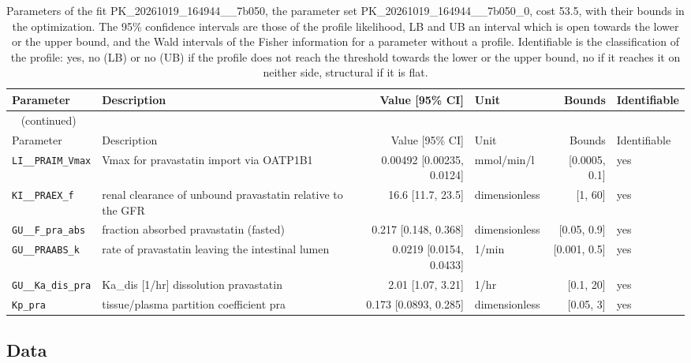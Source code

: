 \documentclass{article}
\begin{document}
\begin{longtable}{llrlrl}
\caption{Parameters of the fit PK\_20261019\_164944\_\_7b050, the parameter set PK\_20261019\_164944\_\_7b050\_0, cost 53.5, with their bounds in the optimization. The 95\% confidence intervals are those of the profile likelihood, LB and UB an interval which is open towards the lower or the upper bound, and the Wald intervals of the Fisher information for a parameter without a profile. Identifiable is the classification of the profile: yes, no (LB) or no (UB) if the profile does not reach the threshold towards the lower or the upper bound, no if it reaches it on neither side, structural if it is flat.}\label{tab:parameters:PK_20261019_164944__7b050} \\
\toprule
Parameter & Description & Value [95\% CI] & Unit & Bounds & Identifiable \\
\midrule
\endfirsthead
\multicolumn{6}{l}{\small\tablename~\thetable{} (continued)} \\
\toprule
Parameter & Description & Value [95\% CI] & Unit & Bounds & Identifiable \\
\midrule
\endhead
\bottomrule
\endlastfoot
\texttt{LI\_\_PRAIM\_Vmax} & Vmax for pravastatin import via OATP1B1 & 0.00492 [0.00235, 0.0124] & mmol/min/l & [0.0005, 0.1] & yes \\
\texttt{KI\_\_PRAEX\_f} & renal clearance of unbound pravastatin relative to the GFR & 16.6 [11.7, 23.5] & dimensionless & [1, 60] & yes \\
\texttt{GU\_\_F\_pra\_abs} & fraction absorbed pravastatin (fasted) & 0.217 [0.148, 0.368] & dimensionless & [0.05, 0.9] & yes \\
\texttt{GU\_\_PRAABS\_k} & rate of pravastatin leaving the intestinal lumen & 0.0219 [0.0154, 0.0433] & 1/min & [0.001, 0.5] & yes \\
\texttt{GU\_\_Ka\_dis\_pra} & Ka\_dis [1/hr] dissolution pravastatin & 2.01 [1.07, 3.21] & 1/hr & [0.1, 20] & yes \\
\texttt{Kp\_pra} & tissue/plasma partition coefficient pra & 0.173 [0.0893, 0.285] & dimensionless & [0.05, 3] & yes \\
\end{longtable}

\subsection{Data}
\end{document}
